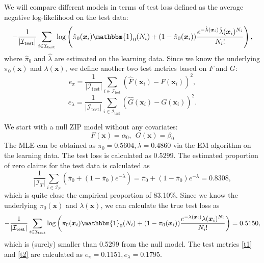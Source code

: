 \documentclass[11pt]{article}
\numberwithin{equation}{section}
\def\bx{\boldsymbol{x}}
\begin{document}
We will compare different models in terms of test loss defined as the average negative log-likelihood on the test data:
\begin{equation}\label{zip-test-loss}
	-\frac{1}{|\mathcal{I}_\text{test}|}\sum_{i\in\mathcal{I}_\text{test}}\log \left(\hat{\pi}_0(\bx_i)\mathbbm{1}_0(N_i) + 
	(1-\hat{\pi}_0(\bx_i))\frac{e^{-\hat{\lambda}(\bx_i)}\hat{\lambda}(\bx_i)^{N_i}}{N_i!}\right),
\end{equation} 
where $\hat{\pi}_0$ and $\hat{\lambda}$ are estimated on the learning data. 
Since we know the underlying $\pi_0(\bx)$ and $\lambda(\bx)$, we define another two test metrics based on $F$ and $G$:
\begin{equation}\label{t1}
	e_\pi=\frac{1}{|\mathcal{I}_\text{test}|}\sum_{i\in\mathcal{I}_\text{test}}(\hat{F}(\bx_i)-F(\bx_i))^2,
\end{equation}
\begin{equation}\label{t2}
	e_\lambda=\frac{1}{|\mathcal{I}_\text{test}|}\sum_{i\in\mathcal{I}_\text{test}}(\hat{G}(\bx_i)-G(\bx_i))^2.
\end{equation}


We start with a null ZIP model without any covariates:
\begin{equation}\label{zip-null}
	F(\bx)=\alpha_0, ~~G(\bx)=\beta_0 
\end{equation}
The MLE can be obtained as $\bar{\pi}_0=0.5604, \bar{\lambda}=0.4860$ via the EM algorithm on the learning data.
The test loss is calculated as $0.5299$. 
The estimated proportion of zero claims for the test data is calculated as 
$$\frac{1}{|\mathcal{I}_T|}\sum_{i\in\mathcal{I}_T}\left(\bar{\pi}_0+(1-\bar{\pi}_0)e^{-\bar{\lambda}}\right)=\bar{\pi}_0+(1-\bar{\pi}_0)e^{-\bar{\lambda}}=0.8308,$$
which is quite close the empirical proportion of 83.10\%.
Since we know the underlying $\pi_0(\bx)$ and $\lambda(\bx)$, we can calculate the true test loss as 
\begin{equation}
	-\frac{1}{|\mathcal{I}_\text{test}|}\sum_{i\in\mathcal{I}_\text{test}}\log \left({\pi}_0(\bx_i)\mathbbm{1}_0(N_i) + 
	(1-{\pi}_0(\bx_i))\frac{e^{-{\lambda}(\bx_i)}{\lambda}(\bx_i)^{N_i}}{N_i!}\right)=0.5150,
\end{equation}   
which is (surely) smaller than 0.5299 from the null model.
The test metrics \eqref{t1} and \eqref{t2} are calculated as $e_\pi=0.1151, e_\lambda=0.1795$.
\end{document}
